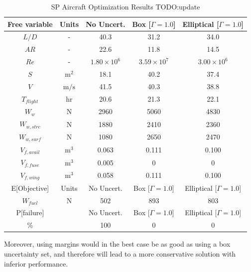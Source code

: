 \begin{table}[!h]
\begin{center}
\caption{\label{tab:results} SP Aircraft Optimization Results TODO:update}
\begin{tabular}{c c c c c}
\hline
Free variable & Units & No Uncert. & Box [$\Gamma = 1.0$] & Elliptical [$\Gamma = 1.0$] \\
\hline
$L/D$ & - & 40.3 & 31.2 & 34.0 \\
$AR$ & - & 22.6 & 11.8 & 14.5 \\
$Re$ & - & $1.80 \times 10^6$ & $3.59 \times 10^7$ & $3.00 \times 10^6$ \\
$S$ & $\mathrm{m^2}$ & 18.1 & 40.2 & 37.4 \\
$V$ & $\mathrm{m/s}$ & 41.5 & 40.3 & 38.8 \\
$T_{flight}$ & $\mathrm{hr}$ & 20.6 & 21.3 & 22.1 \\
$W_w$ & $\mathrm{N}$ & 2960 & 5060 & 4830 \\
$W_{w,strc}$ & $\mathrm{N}$ & 1880 & 2410 & 2360 \\
$W_{w,surf}$ & $\mathrm{N}$ & 1080 & 2650 & 2470 \\
$V_{f,avail}$ & $\mathrm{m^3}$ & 0.063 & 0.111 & 0.100 \\
$V_{f,fuse}$ & $\mathrm{m^3}$ & 0.005 & 0 & 0 \\
$V_{f,wing}$ & $\mathrm{m^3}$ & 0.058 & 0.111 & 0.100 \\
\hline
E[Objective] & Units & No Uncert. & Box [$\Gamma = 1.0$] & Elliptical [$\Gamma = 1.0$] \\
\hline
$W_{fuel}$ & $\mathrm{N}$ & 502 & 893 & 803 \\
\hline
P[failure] & & No Uncert. & Box [$\Gamma = 1.0$] & Elliptical [$\Gamma = 1.0$] \\
\hline
\% & & 100 & 0 & 0\\
\hline
\end{tabular}
\end{center}
\end{table}


Moreover, using margins would in the best case be as good as using a box uncertainty set, and therefore will lead
to a more conservative solution with inferior performance.

